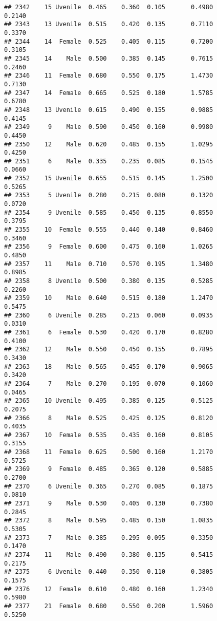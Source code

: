 \documentclass[
]{article}
\begin{document}
\begin{verbatim}
## 2342    15 Uvenile  0.465    0.360  0.105       0.4980         0.2140
## 2343    13 Uvenile  0.515    0.420  0.135       0.7110         0.3370
## 2344    14  Female  0.525    0.405  0.115       0.7200         0.3105
## 2345    14    Male  0.500    0.385  0.145       0.7615         0.2460
## 2346    11  Female  0.680    0.550  0.175       1.4730         0.7130
## 2347    14  Female  0.665    0.525  0.180       1.5785         0.6780
## 2348    13 Uvenile  0.615    0.490  0.155       0.9885         0.4145
## 2349     9    Male  0.590    0.450  0.160       0.9980         0.4450
## 2350    12    Male  0.620    0.485  0.155       1.0295         0.4250
## 2351     6    Male  0.335    0.235  0.085       0.1545         0.0660
## 2352    15 Uvenile  0.655    0.515  0.145       1.2500         0.5265
## 2353     5 Uvenile  0.280    0.215  0.080       0.1320         0.0720
## 2354     9 Uvenile  0.585    0.450  0.135       0.8550         0.3795
## 2355    10  Female  0.555    0.440  0.140       0.8460         0.3460
## 2356     9  Female  0.600    0.475  0.160       1.0265         0.4850
## 2357    11    Male  0.710    0.570  0.195       1.3480         0.8985
## 2358     8 Uvenile  0.500    0.380  0.135       0.5285         0.2260
## 2359    10    Male  0.640    0.515  0.180       1.2470         0.5475
## 2360     6 Uvenile  0.285    0.215  0.060       0.0935         0.0310
## 2361     6  Female  0.530    0.420  0.170       0.8280         0.4100
## 2362    12    Male  0.550    0.450  0.155       0.7895         0.3430
## 2363    18    Male  0.565    0.455  0.170       0.9065         0.3420
## 2364     7    Male  0.270    0.195  0.070       0.1060         0.0465
## 2365    10 Uvenile  0.495    0.385  0.125       0.5125         0.2075
## 2366     8    Male  0.525    0.425  0.125       0.8120         0.4035
## 2367    10  Female  0.535    0.435  0.160       0.8105         0.3155
## 2368    11  Female  0.625    0.500  0.160       1.2170         0.5725
## 2369     9  Female  0.485    0.365  0.120       0.5885         0.2700
## 2370     6 Uvenile  0.365    0.270  0.085       0.1875         0.0810
## 2371     9    Male  0.530    0.405  0.130       0.7380         0.2845
## 2372     8    Male  0.595    0.485  0.150       1.0835         0.5305
## 2373     7    Male  0.385    0.295  0.095       0.3350         0.1470
## 2374    11    Male  0.490    0.380  0.135       0.5415         0.2175
## 2375     6 Uvenile  0.440    0.350  0.110       0.3805         0.1575
## 2376    12  Female  0.610    0.480  0.160       1.2340         0.5980
## 2377    21  Female  0.680    0.550  0.200       1.5960         0.5250

\end{verbatim}
\end{document}
